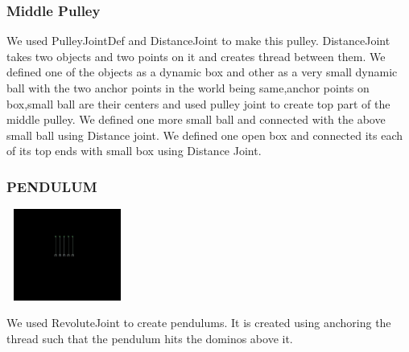 \documentclass[t,compress,11pt,xcolor=dvipsnames]{beamer}
\begin{document}
\begin{frame}
\frametitle{Middle Pulley}
We used PulleyJointDef and DistanceJoint to make this pulley.
DistanceJoint takes two objects and two points on it and creates thread between them.
We defined one of the objects as a dynamic box and other as a very small dynamic ball
with the two anchor points in the world being same,anchor points on box,small ball are their centers and used pulley joint to create top part of the middle pulley.
We defined one more small ball and connected with the above small ball using Distance joint.
We defined one open box and connected its each of its top ends with small box using Distance Joint.
\end{frame}
\begin{frame}
\frametitle{PENDULUM}
\begin{center}
\includegraphics[width=4cm,height=3cm]{pendulum}
\end{center}
We used RevoluteJoint to create pendulums.
It is created using anchoring the thread such that the pendulum hits the dominos above it.
\end{frame}
\end{document}
